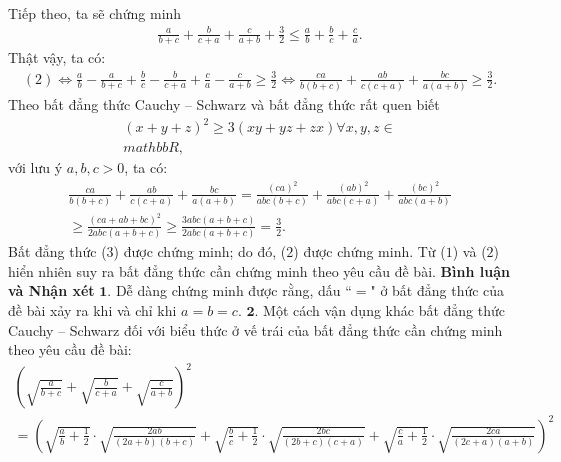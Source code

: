 \begin{multicols}{2}
\begin{align*}
	\end{align*}
	Tiếp theo, ta sẽ chứng minh
	\begin{align*}
		\frac{a}{{b + c}} + \frac{b}{{c + a}} + \frac{c}{{a + b}} + \frac{3}{2} \le \frac{a}{b} + \frac{b}{c} + \frac{c}{a}.
	\end{align*}
	Thật vậy, ta có:
	\begin{align*}
		(2) \Leftrightarrow \frac{a}{b} - \frac{a}{{b + c}} + \frac{b}{c} - \frac{b}{{c + a}} + \frac{c}{a} - \frac{c}{{a + b}} \ge \frac{3}{2} \Leftrightarrow \frac{{ca}}{{b\left( {b + c} \right)}} + \frac{{ab}}{{c\left( {c + a} \right)}} + \frac{{bc}}{{a\left( {a + b} \right)}} \ge \frac{3}{2}. \tag{$3$}
	\end{align*}
	Theo bất đẳng thức Cauchy -- Schwarz và bất đẳng thức rất quen biết
	\begin{align*}
		{\left( {x + y + z} \right)^2} \ge 3\left( {xy + yz + zx} \right)\forall x,y,z \in  \\mathbb{R},
	\end{align*}
	với lưu ý $a, b, c > 0$, ta có:
	\begin{align*}
			\frac{{ca}}{{b\left( {b + c} \right)}} + \frac{{ab}}{{c\left( {c + a} \right)}} + \frac{{bc}}{{a\left( {a + b} \right)}} = \frac{{{{\left( {ca} \right)}^2}}}{{abc\left( {b + c} \right)}} + \frac{{{{\left( {ab} \right)}^2}}}{{abc\left( {c + a} \right)}} + \frac{{{{\left( {bc} \right)}^2}}}{{abc\left( {a + b} \right)}}\\
			 \ge \frac{{{{\left( {ca + ab + bc} \right)}^2}}}{{2abc\left( {a + b + c} \right)}} \ge \frac{{3abc\left( {a + b + c} \right)}}{{2abc\left( {a + b + c} \right)}} = \frac{3}{2}.
	\end{align*}
	Bất đẳng thức ($3$) được chứng minh; do đó, ($2$) được chứng minh.
	\vskip 0.05cm
	Từ ($1$) và ($2$) hiển nhiên suy ra bất đẳng thức cần chứng minh theo yêu cầu đề bài.
	\vskip 0.05cm
	\textbf{Bình luận và Nhận xét}
	\vskip 0.05cm
	$\pmb{1.}$ Dễ dàng chứng minh được rằng, dấu ``$=$" ở bất đẳng thức của đề bài xảy ra khi và chỉ khi $a = b = c$.
	\vskip 0.05cm
	$\pmb{2.}$ Một cách vận dụng khác bất đẳng thức Cauchy -- Schwarz đối với biểu thức ở vế trái của bất đẳng thức cần chứng minh theo yêu cầu đề bài:
	\begin{align*}
			{\left( {\sqrt {\frac{a}{{b + c}}}  + \sqrt {\frac{b}{{c + a}}}  + \sqrt {\frac{c}{{a + b}}} } \right)^2}\\
			= {\left( {\sqrt {\frac{a}{b} + \frac{1}{2}}  \cdot \sqrt {\frac{{2ab}}{{\left( {2a + b} \right)\left( {b + c} \right)}}}  + \sqrt {\frac{b}{c} + \frac{1}{2}}  \cdot \sqrt {\frac{{2bc}}{{\left( {2b + c} \right)\left( {c + a} \right)}}}  + \sqrt {\frac{c}{a} + \frac{1}{2}}  \cdot \sqrt {\frac{{2ca}}{{\left( {2c + a} \right)\left( {a + b} \right)}}} } \right)^2}\\

\end{align*}
\end{multicols}
